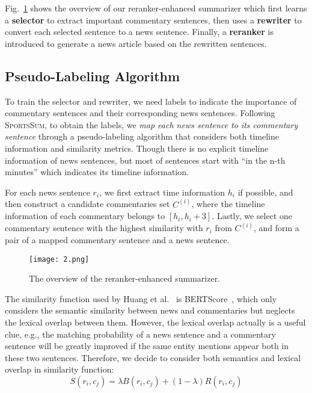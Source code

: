 Fig.~\ref{fig:overview} shows the overview of our reranker-enhanced summarizer which first learns a \textbf{selector} to extract important commentary sentences, then uses a \textbf{rewriter} to convert each selected sentence to a news sentence. Finally,  a \textbf{reranker} is introduced to generate a news article based on the rewritten sentences. 

\subsection{Pseudo-Labeling Algorithm}
To train the selector and rewriter, we need labels to indicate the importance of commentary sentences and their corresponding news sentences. Following \textsc{SportsSum}\cite{Huang2020GeneratingSN}, to obtain the labels, we \emph{map each news sentence to its commentary sentence} through a pseudo-labeling algorithm that considers both timeline information and similarity metrics.
Though there is no explicit timeline information of news sentences, but most of sentences start with ``in the n-th minutes'' which indicates its timeline information.

For each news sentence $r_{i}$, we first extract time information $h_{i}$ if possible, and then construct a candidate commentaries set $C^{(i)}$, where the timeline information of each commentary belongs to $[h_{i},h_{i}+3]$. Lastly, we select one commentary sentence with the highest similarity with $r_{i}$ from $C^{(i)}$, and form a pair of a mapped commentary sentence and a news sentence.

\begin{figure}[t]
  \centerline{\texttt{[image: 2.png]}}
  \caption{The overview of the reranker-enhanced summarizer.}
  \label{fig:overview}
  \end{figure}

The similarity function used by Huang et al.~\cite{Huang2020GeneratingSN} is BERTScore~\cite{Zhang2020BERTScoreET}, which only considers the semantic similarity between news and commentaries but neglects the lexical overlap between them. However, the lexical overlap actually is a useful clue, e.g., the matching probability of a news sentence and a commentary sentence will be greatly improved if the same entity mentions appear both in these two sentences. Therefore, we decide to consider both semantics and lexical overlap in similarity function:
\begin{equation}
\label{similarity_function}
S(r_{i},c_{j}) = \lambda B(r_{i},c_{j}) + (1-\lambda) R(r_{i},c_{j})
\end{equation}


